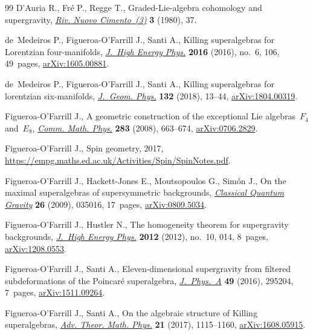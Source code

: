 \documentclass[11pt]{article}
\numberwithin{equation}{section}
\numberwithin{equation}{section}
\newcommand{\1}{\mathbbm{1}}
\begin{document}
\begin{thebibliography}{99}
D'Auria R., Fr\'e P., Regge T., Graded-{L}ie-algebra cohomology and
 supergravity, \href{https://doi.org/10.1007/BF02905929}{\textit{Riv. Nuovo
 Cimento~(3)}} \textbf{3} (1980), 37.

de~Medeiros P., Figueroa-O'Farrill J., Santi A., Killing superalgebras for
 {L}orentzian four-manifolds,
 \href{https://doi.org/10.1007/JHEP06(2016)106}{\textit{J.~High Energy Phys.}}
 \textbf{2016} (2016), no.~6, 106, 49~pages,
 \href{http://arxiv.org/abs/1605.00881}{arXiv:1605.00881}.

de~Medeiros P., Figueroa-O'Farrill J., Santi A., Killing superalgebras for
 lorentzian six-manifolds,
 \href{https://doi.org/10.1016/j.geomphys.2018.05.019}{\textit{J.~Geom.
 Phys.}} \textbf{132} (2018), 13--44,
 \href{http://arxiv.org/abs/1804.00319}{arXiv:1804.00319}.

Figueroa-O'Farrill J., A geometric construction of the exceptional {L}ie
 algebras~{$F_4$} and~{$E_8$},
 \href{https://doi.org/10.1007/s00220-008-0581-7}{\textit{Comm. Math. Phys.}}
 \textbf{283} (2008), 663--674,
 \href{http://arxiv.org/abs/0706.2829}{arXiv:0706.2829}.

Figueroa-O'Farrill J., Spin geometry, 2017,  \url{https://empg.maths.ed.ac.uk/Activities/Spin/SpinNotes.pdf}.

Figueroa-O'Farrill J., Hackett-Jones E., Moutsopoulos G., Sim\'on J., On the
 maximal superalgebras of supersymmetric backgrounds,
 \href{https://doi.org/10.1088/0264-9381/26/3/035016}{\textit{Classical
 Quantum Gravity}} \textbf{26} (2009), 035016, 17~pages,
 \href{http://arxiv.org/abs/0809.5034}{arXiv:0809.5034}.

Figueroa-O'Farrill J., Hustler N., The homogeneity theorem for supergravity
 backgrounds, \href{https://doi.org/10.1007/jhep10(2012)014}{\textit{J.~High
 Energy Phys.}} \textbf{2012} (2012), no.~10, 014, 8~pages,
 \href{http://arxiv.org/abs/1208.0553}{arXiv:1208.0553}.

Figueroa-O'Farrill J., Santi A., Eleven-dimensional supergravity from filtered
 subdeformations of the {P}oincar\'e superalgebra,
 \href{https://doi.org/10.1088/1751-8113/49/29/295204}{\textit{J.~Phys.~A}}
 \textbf{49} (2016), 295204, 7~pages,
 \href{http://arxiv.org/abs/1511.09264}{arXiv:1511.09264}.

Figueroa-O'Farrill J., Santi A., On the algebraic structure of {K}illing
 superalgebras,
 \href{https://doi.org/10.4310/ATMP.2017.v21.n5.a1}{\textit{Adv. Theor. Math.
 Phys.}} \textbf{21} (2017), 1115--1160,
 \href{http://arxiv.org/abs/1608.05915}{arXiv:1608.05915}.


\end{thebibliography}
\end{document}

